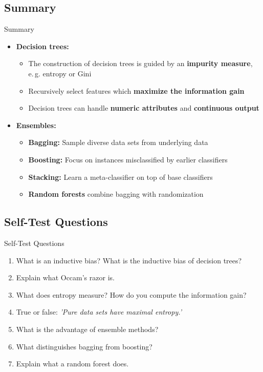 \subsection{Summary}

\begin{frame}{Summary}{}
	\begin{itemize}
		\item \textbf{Decision trees:}
		\begin{itemize}
			\item The construction of decision trees is guided by an \textbf{impurity measure}, \\
				e.\,g. entropy or Gini
			\item Recursively select features which \textbf{maximize the information gain}
			\item Decision trees can handle \textbf{numeric attributes} and \textbf{continuous output}
		\end{itemize}
		\item \textbf{Ensembles:}
		\begin{itemize}
			\item \textbf{Bagging:} Sample diverse data sets from underlying data
			\item \textbf{Boosting:} Focus on instances misclassified by earlier classifiers
			\item \textbf{Stacking:} Learn a meta-classifier on top of base classifiers
			\item \textbf{Random forests} combine bagging with randomization
		\end{itemize}
	\end{itemize}
\end{frame}


\subsection{Self-Test Questions}

\begin{frame}{Self-Test Questions}{}\important
	\begin{enumerate}
		\item What is an inductive bias? What is the inductive bias of decision trees?
		\item Explain what Occam's razor is.
		\item What does entropy measure? How do you compute the information gain?
		\item True or false: \textit{'Pure data sets have maximal entropy.'}
		\item What is the advantage of ensemble methods?
		\item What distinguishes bagging from boosting?
		\item Explain what a random forest does.
	\end{enumerate}
\end{frame}


